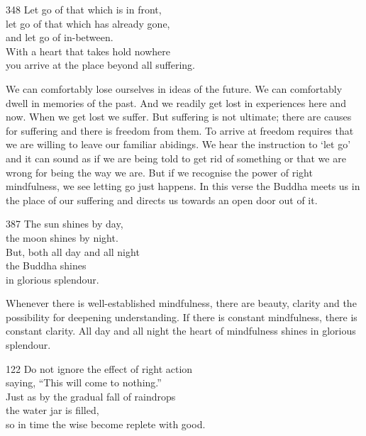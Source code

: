 
\begin{dhpVerse}{348}
\label{dhp-348}
Let go of that which is in front,\\
let go of that which has already gone,\\
and let go of in-between.\\
With a heart that takes hold nowhere\\
you arrive at the place beyond all suffering.
\end{dhpVerse}

\begin{dhpRefl}

We can comfortably lose ourselves in ideas of the future. We can
comfortably dwell in memories of the past. And we readily get lost in
experiences here and now. When we get lost we suffer. But suffering
is not ultimate; there are causes for suffering and there is freedom
from them. To arrive at freedom requires that we are willing to leave
our familiar abidings. We hear the instruction to `let go' and it can
sound as if we are being told to get rid of something or that we are
wrong for being the way we are. But if we recognise the power of
right mindfulness, we see letting go just happens. In this verse the
Buddha meets us in the place of our suffering and directs us towards
an open door out of it.

\end{dhpRefl}


\begin{dhpVerse}{387}
\label{dhp-387}
The sun shines by day,\\
the moon shines by night.\\
But, both all day and all night\\
the Buddha shines\\
in glorious splendour.
\end{dhpVerse}

\begin{dhpRefl}

Whenever there is well-established mindfulness, there are beauty,
clarity and the possibility for deepening understanding. If there is
constant mindfulness, there is constant clarity. All day and all
night the heart of mindfulness shines in glorious splendour.

\end{dhpRefl}


\begin{dhpVerse}{122}
\label{dhp-122}
Do not ignore the effect of right action\\
saying, ``This will come to nothing.''\\
Just as by the gradual fall of raindrops\\
the water jar is filled,\\
so in time the wise become replete with good.
\end{dhpVerse}

